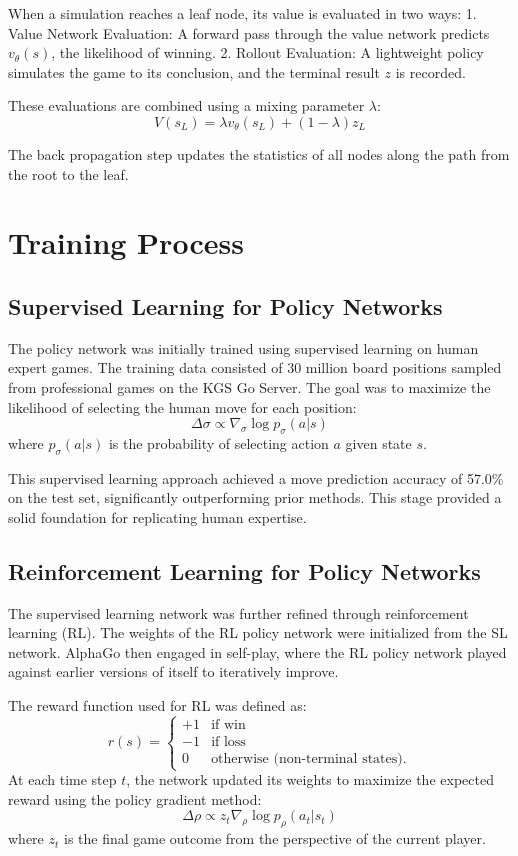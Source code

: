 \documentclass[conference]{IEEEtran}
\begin{document}
When a simulation reaches a leaf node, its value is evaluated in two ways:
1. Value Network Evaluation: A forward pass through the value network predicts \( v_\theta(s) \), the likelihood of winning.
2. Rollout Evaluation: A lightweight policy simulates the game to its conclusion, and the terminal result \( z \) is recorded.

These evaluations are combined using a mixing parameter \( \lambda \):
\[
V(s_L) = \lambda v_\theta(s_L) + (1 - \lambda) z_L
\]

The back propagation step updates the statistics of all nodes along the path from the root to the leaf.


\section{Training Process}

\subsection{Supervised Learning for Policy Networks}
The policy network was initially trained using supervised learning on human expert games. The training data consisted of 30 million board positions sampled from professional games on the KGS Go Server. The goal was to maximize the likelihood of selecting the human move for each position:
\[
\Delta \sigma \propto \nabla_\sigma \log p_\sigma(a | s)
\]
where \( p_\sigma(a | s) \) is the probability of selecting action \( a \) given state \( s \).

This supervised learning approach achieved a move prediction accuracy of 57.0\% on the test set, significantly outperforming prior methods. This stage provided a solid foundation for replicating human expertise.

\subsection{Reinforcement Learning for Policy Networks}
The supervised learning network was further refined through reinforcement learning (RL). The weights of the RL policy network were initialized from the SL network. AlphaGo then engaged in self-play, where the RL policy network played against earlier versions of itself to iteratively improve.

The reward function used for RL was defined as:
\[
r(s) = 
\begin{cases} 
+1 & \text{if win} \\
-1 & \text{if loss} \\
0 & \text{otherwise (non-terminal states).}
\end{cases}
\]
At each time step \( t \), the network updated its weights to maximize the expected reward using the policy gradient method:
\[
\Delta \rho \propto z_t \nabla_\rho \log p_\rho(a_t | s_t)
\]
where \( z_t \) is the final game outcome from the perspective of the current player.
\end{document}
